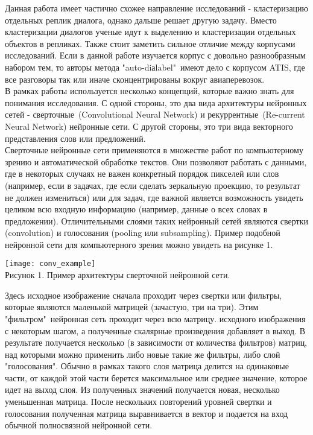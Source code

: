 \documentclass[a4paper,14pt]{article}
\begin{document}
\begin{justify}
\indent
Данная работа имеет частично схожее направление исследований - кластеризацию отдельных реплик диалога, однако дальше решает другую задачу. Вместо кластеризации диалогов ученые идут к выделению и кластеризации отдельных объектов в репликах. Также стоит заметить сильное отличие между корпусами исследований. Если в данной работе изучается корпус с довольно разнообразным набором тем, то авторы метода "auto-diаlabel"\ имеют дело с корпусом ATIS, где все разговоры так или иначе сконцентрированы вокруг авиаперевозок. \\
\indent
В рамках работы используется несколько концепций, которые важно знать для понимания исследования. С одной стороны, это два вида архитектуры нейронных сетей - сверточные\ (Convolutional Neural Network) и рекуррентные\ (Re-current Neural Network) нейронные сети. С другой стороны, это три вида векторного представления слов или предложений. \\
\indent 
Сверточные нейронные сети применяются в множестве работ по компьютерному зрению и автоматической обработке текстов. Они позволяют работать с данными, где в некоторых случаях не важен конкретный порядок пикселей или слов (например, если в задачах, где если сделать зеркальную проекцию, то результат не должен измениться) или для задач, где важной является возможность увидеть целиком всю входную информацию (например, данные о всех словах в предложении). Отличительными слоями таких нейронный сетей являются свертки (convolution) и голосования (pooling или subsampling). Пример подобной нейронной сети для компьютерного зрения можно увидеть на рисунке 1. \cite{cnn-tut}
\begin{center}
	\texttt{[image: conv\_example]}\\
	Рисунок 1. Пример архитектуры сверточной нейронной сети.
\end{center}
\indent
Здесь исходное изображение сначала проходит через свертки или фильтры, которые являются маленькой матрицей (зачастую, три на три). Этим "фильтром"\ нейронная сеть проходит через всю матрицу. исходного изображения с некоторым шагом, а полученные скалярные произведения добавляет в выход. В результате получается несколько (в зависимости от количества фильтров) матриц, над которыми можно применить либо новые такие же фильтры, либо слой "голосования". Обычно в рамках такого слоя матрица делится на одинаковые части, от каждой этой части берется максимальное или среднее значение, которое идет на выход слоя. Из полученных значений получается новая, несколько уменьшенная матрица. После нескольких повторений уровней свертки и голосования полученная матрица выравнивается в вектор и подается на вход обычной полносвязной нейронной сети. \\

\end{justify}
\end{document}
